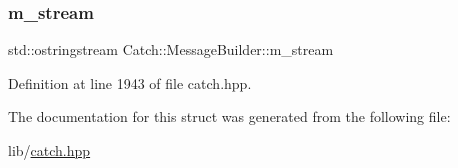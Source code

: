 \hypertarget{struct_catch_1_1_message_builder_a6488ab0cc4ea52affc9c0612c7c5df6b}{}\label{struct_catch_1_1_message_builder_a6488ab0cc4ea52affc9c0612c7c5df6b} 
\subsubsection{\texorpdfstring{m\+\_\+stream}{m\_stream}}
{\footnotesize\ttfamily std\+::ostringstream Catch\+::\+Message\+Builder\+::m\+\_\+stream}



Definition at line 1943 of file catch.\+hpp.



The documentation for this struct was generated from the following file\+:\begin{DoxyCompactItemize}
\item 
lib/\hyperlink{catch_8hpp}{catch.\+hpp}\end{DoxyCompactItemize}
